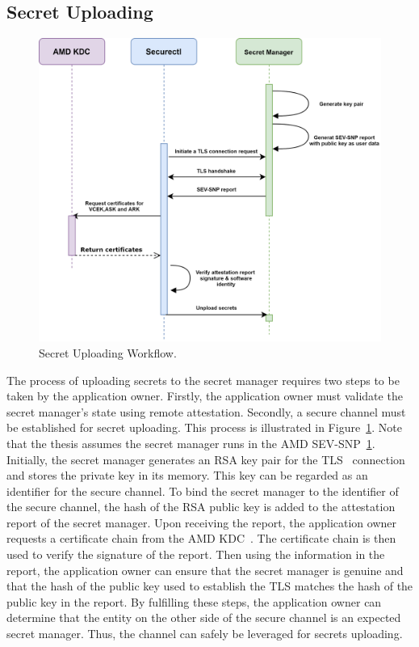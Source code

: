 \subsection{Secret Uploading}
\label{sec:design_Secret_Uploading}
\begin{figure}[!htb]
    \centering
    \includegraphics[height=0.4\textheight]{images/upload_secret.png}
    \caption[Secret Uploading Workflow]{Secret Uploading Workflow.}
    \label{fig:upload_secret}
\end{figure}

The process of uploading secrets to the secret manager requires two steps to be taken by the application owner. Firstly, the application owner must validate the secret manager's state using remote attestation. Secondly, a secure channel must be established for secret uploading. This process is illustrated in Figure~\ref{fig:upload_secret}. 
Note that the thesis assumes the secret manager runs in the AMD SEV-SNP~\ref{fig:upload_secret}. Initially, the secret manager generates an RSA key pair for the TLS~\cite*{tls_record_size} connection and stores the private key in its memory. This key can be regarded as an identifier for the secure channel. To bind the secret manager to the identifier of the secure channel, the hash of the RSA public key is added to the attestation report of the secret manager. 
Upon receiving the report, the application owner requests a certificate chain from the AMD KDC~\cite*{snp_kdc}. The certificate chain is then used to verify the signature of the report. Then using the information in the report, the application owner can ensure that the secret manager is genuine and that the hash of the public key used to establish the TLS matches the hash of the public key 
in the report. By fulfilling these steps, the application owner can determine that the entity on the other side of the secure channel is an expected secret manager. Thus, the channel can safely be leveraged for secrets uploading.


